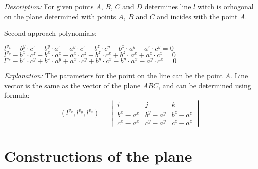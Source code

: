\documentclass{article}
\begin{document}
\begin{description}
{\em Description:} For given points $A$, $B$, $C$ and $D$ determines
line $l$ witch is orhogonal on the plane determined with points $A$,
$B$ and $C$ and incides with the point $A$.

Second approach polynomials:
\begin{tabbing}
$l^{v_x} - b^y\cdot c^z + b^y\cdot a^z + a^y\cdot c^z + b^z\cdot c^y - b^z\cdot a^y - a^z\cdot c^y = 0$ \\
$l^{v_y} - b^x\cdot c^z - b^x\cdot a^z - a^x\cdot c^z - b^z\cdot c^x + b^z\cdot a^x + a^z\cdot c^x = 0$ \\
$l^{v_z} - b^x\cdot c^y + b^x\cdot a^y + a^x\cdot c^y + b^y\cdot c^x - b^y\cdot a^x - a^y\cdot c^x = 0$ 
\end{tabbing}

{\em Explanation:} The parameters for the point on the line can be the
point $A$. Line vector is the same as the vector of the plane $ABC$,
and can be determined using formula:
$$(l^{v_x}, l^{v_y}, l^{v_z}) = \begin{vmatrix} i & j & k \\ b^x - a^x
  & b^y - a^y & b^z - a^z \\ c^x - a^x & c^y - a^y & c^z - a^z
\end{vmatrix}$$
\end{description}


\section{Constructions of the plane}
\end{document}
